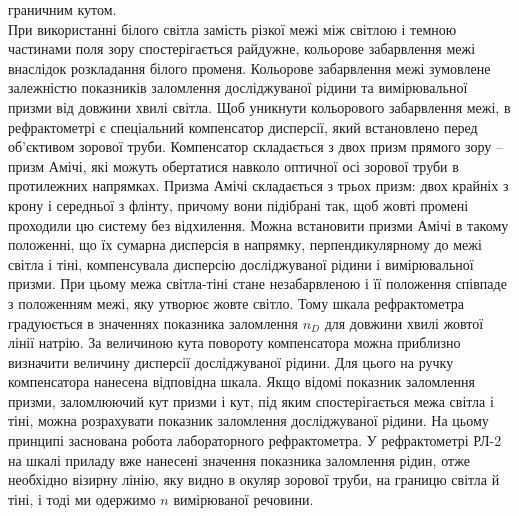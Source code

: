 граничним кутом. \\
При використанні білого світла замість різкої межі між світлою і темною частинами поля зору спостерігається райдужне, кольорове забарвлення межі внаслідок розкладання білого променя. Кольорове забарвлення межі зумовлене залежністю показників заломлення досліджуваної рідини та вимірювальної призми від довжини хвилі світла.
Щоб уникнути кольорового забарвлення межі, в рефрактометрі є спеціальний компенсатор дисперсії, який встановлено перед об’єктивом зорової труби. Компенсатор складається з двох призм прямого зору – призм Амічі, які можуть обертатися навколо оптичної осі зорової труби в протилежних напрямках. Призма Амічі складається з трьох призм: двох крайніх з крону і середньої з флінту, причому вони підібрані так, щоб жовті промені проходили цю систему без відхилення. Можна встановити призми Амічі в такому положенні, що їх сумарна дисперсія в напрямку, перпендикулярному до межі світла і тіні, компенсувала дисперсію досліджуваної рідини і вимірювальної призми. При цьому межа світла-тіні стане незабарвленою і її положення співпаде з положенням межі, яку утворює жовте світло. Тому шкала рефрактометра градуюється
в значеннях показника заломлення $n_D$ для довжини хвилі жовтої лінії натрію. За величиною кута повороту компенсатора можна приблизно визначити величину дисперсії досліджуваної рідини. Для цього на ручку компенсатора нанесена відповідна шкала. Якщо відомі показник заломлення призми, заломлюючий кут призми і кут, під яким
спостерігається межа світла і тіні, можна розрахувати показник заломлення досліджуваної рідини. На цьому принципі заснована робота лабораторного рефрактометра. У рефрактометрі РЛ-2 на шкалі приладу вже нанесені значення показника заломлення рідин, отже необхідно
візирну лінію, яку видно в окуляр зорової труби, на границю світла й тіні, і тоді ми одержимо $n$ вимірюваної речовини.





